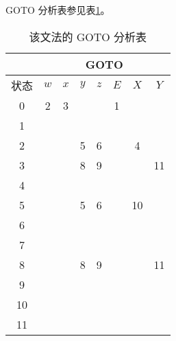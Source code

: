 \documentclass[UTF8]{ctexart}
\begin{document}
        GOTO 分析表参见表\ref{lr0goto}。
        \begin{table}[htbp!]
            \centering
            \begin{tabular}{|c|c|c|c|c|c|c|c|}
                \hline
                & \multicolumn{7}{|c|}{GOTO} \\
                \hline
                状态 & $w$ & $x$ & $y$ & $z$ & $E$ & $X$ & $Y$ \\
                \hline
                0    &  2  &  3  &     &     &  1  &     &     \\
                \hline
                1    &     &     &     &     &     &     &     \\
                \hline
                2    &     &     &  5  &  6  &     &  4  &     \\
                \hline
                3    &     &     &  8  &  9  &     &     & 11  \\
                \hline
                4    &     &     &     &     &     &     &     \\
                \hline
                5    &     &     &  5  &  6  &     & 10  &     \\
                \hline
                6    &     &     &     &     &     &     &     \\
                \hline
                7    &     &     &     &     &     &     &     \\
                \hline
                8    &     &     &  8  &  9  &     &     & 11  \\
                \hline
                9    &     &     &     &     &     &     &     \\
                \hline
                10   &     &     &     &     &     &     &     \\
                \hline
                11   &     &     &     &     &     &     &     \\
                \hline
            \end{tabular}
            \caption{该文法的 GOTO 分析表}
            \label{lr0goto}
        \end{table}    
    
\end{document}
